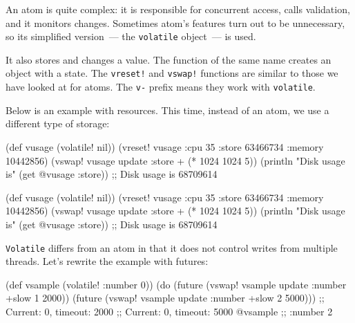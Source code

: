 An atom is quite complex: it is responsible for concurrent access, calls validation, and it monitors changes. Sometimes atom's features turn out to be unnecessary, so its simplified version~--- the \verb|volatile| object~--- is used.


It also stores and changes a value.
The function of the same name creates an object with a state.
The \verb|vreset!| and \verb|vswap!| functions are similar to those we have looked at for atoms. 
The \verb|v-| prefix means they work with \verb|volatile|.

Below is an example with resources. This time, instead of an atom, we use a different type of storage:

\ifx\DEVICETYPE\MOBILE

\begin{english}
  \begin{clojure}
(def vusage (volatile! nil))
(vreset! vusage
         {:cpu 35
          :store 63466734
          :memory 10442856})
(vswap! vusage
  update :store + (* 1024 1024 5))
(println
  "Disk usage is" (get @vusage :store))
;; Disk usage is 68709614
  \end{clojure}
\end{english}

\else

\begin{english}
  \begin{clojure}
(def vusage (volatile! nil))
(vreset! vusage
         {:cpu 35
          :store 63466734
          :memory 10442856})
(vswap! vusage update :store + (* 1024 1024 5))
(println "Disk usage is" (get @vusage :store))
;; Disk usage is 68709614
  \end{clojure}
\end{english}

\fi

\verb|Volatile| differs from an atom in that it does not control writes from multiple threads.
Let's rewrite the example with futures:

\ifx\DEVICETYPE\MOBILE

\begin{english}
  \begin{clojure}
(def vsample (volatile! {:number 0}))
(do (future (vswap! vsample update
              :number +slow 1 2000))
    (future (vswap! vsample update
              :number +slow 2 5000)))
;; Current: 0, timeout: 2000
;; Current: 0, timeout: 5000
@vsample ;; {:number 2}
  \end{clojure}
\end{english}

